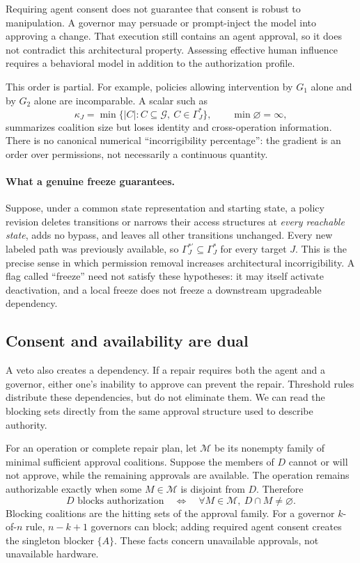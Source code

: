 \documentclass[10pt,letterpaper]{article}
\newcommand{\G}{\mathcal G}
\begin{document}
Requiring agent consent does not guarantee that consent is robust to manipulation. A governor may persuade or prompt-inject the model into approving a change. That execution still contains an agent approval, so it does not contradict this architectural property. Assessing effective human influence requires a behavioral model in addition to the authorization profile.

This order is partial. For example, policies allowing intervention by $G_1$ alone and by $G_2$ alone are incomparable. A scalar such as
\[
 \kappa_J=\min\{|C|: C\subseteq\G,\ C\in\Gamma_J^*\},
 \qquad \min\varnothing=\infty,
\]
summarizes coalition size but loses identity and cross-operation information. There is no canonical numerical ``incorrigibility percentage'': the gradient is an order over permissions, not necessarily a continuous quantity.

\paragraph{What a genuine freeze guarantees.}
Suppose, under a common state representation and starting state, a policy revision deletes transitions or narrows their access structures at \emph{every reachable state}, adds no bypass, and leaves all other transitions unchanged. Every new labeled path was previously available, so $\Gamma_J^{*\prime}\subseteq\Gamma_J^*$ for every target $J$. This is the precise sense in which permission removal increases architectural incorrigibility. A flag called ``freeze'' need not satisfy these hypotheses: it may itself activate deactivation, and a local freeze does not freeze a downstream upgradeable dependency.

\subsection{Consent and availability are dual}
A veto also creates a dependency. If a repair requires both the agent and a governor, either one's inability to approve can prevent the repair. Threshold rules distribute these dependencies, but do not eliminate them. We can read the blocking sets directly from the same approval structure used to describe authority.

For an operation or complete repair plan, let $\mathcal M$ be its nonempty family of minimal sufficient approval coalitions. Suppose the members of $D$ cannot or will not approve, while the remaining approvals are available. The operation remains authorizable exactly when some $M\in\mathcal M$ is disjoint from $D$. Therefore
\begin{equation}
 D\text{ blocks authorization}\quad\Longleftrightarrow\quad
 \forall M\in\mathcal M,\ D\cap M\neq\varnothing. \label{eq:block}
\end{equation}
Blocking coalitions are the hitting sets of the approval family. For a governor $k$-of-$n$ rule, $n-k+1$ governors can block; adding required agent consent creates the singleton blocker $\{A\}$. These facts concern unavailable approvals, not unavailable hardware.
\end{document}

